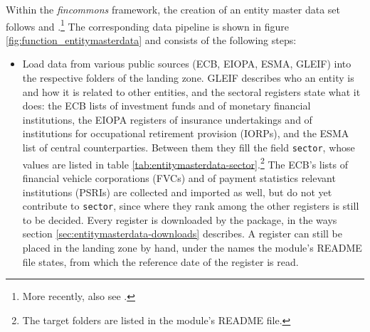 Within the \emph{fincommons} framework, the creation of an entity master data set follows \textcite{ESMA.2018} and \textcite{Lenoci.2021}.\footnote{More recently, also see \textcite{Pezzini.2024}.} The corresponding data pipeline is shown in figure \ref{fig:function_entitymasterdata} and consists of the following steps:
%
\begin{itemize}
	\item Load data from various public sources (ECB, EIOPA, ESMA, GLEIF) into the respective folders of the landing zone. GLEIF describes who an entity is and how it is related to other entities, and the sectoral registers state what it does: the ECB lists of investment funds and of monetary financial institutions, the EIOPA registers of insurance undertakings and of institutions for occupational retirement provision (IORPs), and the ESMA list of central counterparties. Between them they fill the field \texttt{sector}, whose values are listed in table \ref{tab:entitymasterdata-sector}.\footnote{The target folders are listed in the module's README file.} The ECB's lists of financial vehicle corporations (FVCs) and of payment statistics relevant institutions (PSRIs) are collected and imported as well, but do not yet contribute to \texttt{sector}, since where they rank among the other registers is still to be decided. Every register is downloaded by the package, in the ways section \ref{sec:entitymasterdata-downloads} describes. A register can still be placed in the landing zone by hand, under the names the module's README file states, from which the reference date of the register is read.


\end{itemize}
